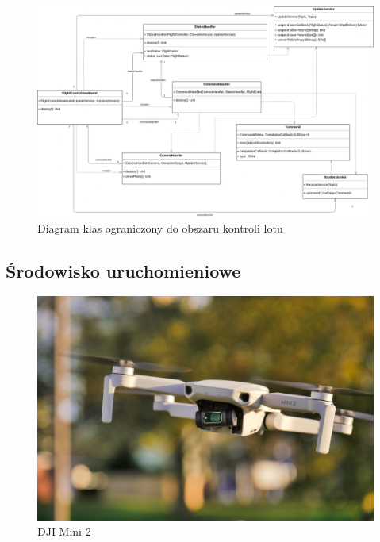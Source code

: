 \begin{figure}[!htp]
  \centering
  \includegraphics[width=16cm]{./Obrazy/handlers.png}
  \caption{Diagram klas ograniczony do obszaru kontroli lotu}
  \end{figure}

\newpage

\subsection{Środowisko uruchomieniowe}
\begin{figure}[!htp]
  \centering
  \includegraphics[width=14cm]{./Obrazy/dji-mini-2.jpg}
  \caption{DJI Mini 2}
  \end{figure}


